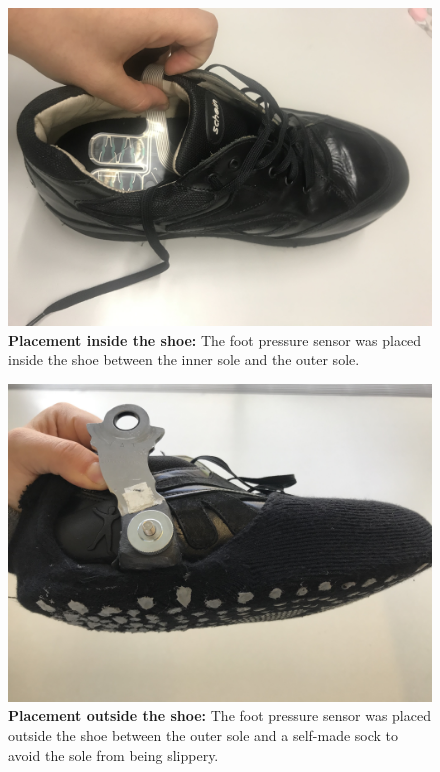 
\begin{figure}[!t]
	\centering
	\includegraphics[width=1\columnwidth]{Appendix/haptic_feedback/Placement_in_Shoe.jpg}
	\caption{\textbf{Placement inside the shoe:} The foot pressure sensor was placed inside the shoe between the inner sole and the outer sole.}
	\label{fig: inside shoe}
\end{figure}


\begin{figure}[!t]
	\centering
	\includegraphics[width=1\columnwidth]{Appendix/haptic_feedback/Placement_outside_shoe.jpg}
	\caption{\textbf{Placement outside the shoe:} The foot pressure sensor was placed outside the shoe between the outer sole and a self-made sock to avoid the sole from being slippery.}
	\label{fig: oudside shoe}
\end{figure}

